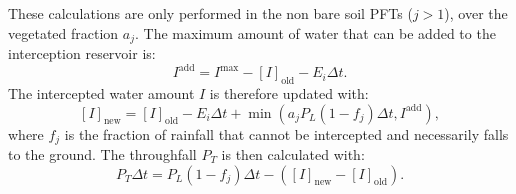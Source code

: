 These calculations are only performed in the non bare soil PFTs ($j>1$), over the vegetated fraction $a_j$. 
The maximum amount of water that can be added to the interception reservoir is:
\begin{equation}\label{eq:interc1}
I^\mathrm{add} = I^\mathrm{max} - [I]_\mathrm{old} - E_i \Delta t.
\end{equation}
The intercepted water amount $I$ is therefore updated with:
\begin{equation}\label{eq:interc2}
[I]_\mathrm{new} = [I]_\mathrm{old} - E_i \Delta t + \min (a_j P_L (1-f_j) \Delta t, I^\mathrm{add}),
\end{equation}
where $f_j$ is the fraction of rainfall that cannot be intercepted and necessarily falls to the ground.
The throughfall $P_T$ is then calculated with:
\begin{equation}\label{eq:interc3}
P_T \Delta t = P_L (1-f_j) \Delta t - ([I]_\mathrm{new} - [I]_\mathrm{old}).
\end{equation}
